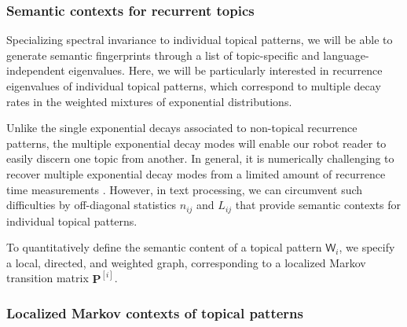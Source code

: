 \documentclass[10pt,journal,compsoc]{IEEEtran}
\begin{document}
\subsubsection{Semantic contexts for recurrent  topics}
Specializing  spectral invariance  to individual {topical patterns}, we will be able to generate  semantic fingerprints through a list of topic-specific and language-independent eigenvalues. Here, we will be particularly interested in recurrence eigenvalues of individual topical patterns, which correspond to multiple decay rates in the weighted mixtures of exponential distributions.


Unlike  the single exponential decays associated to non-topical recurrence patterns, the multiple exponential decay modes  will  enable our robot reader to easily discern one topic from another.
In general, it is  numerically challenging  to  recover multiple exponential decay modes from a limited amount of  recurrence time measurements \cite{BJ2006}. However, in text processing, we can circumvent such difficulties by  off-diagonal statistics $n_{ij}$ and $L_{ij}$ that provide  semantic contexts for individual topical patterns.


To quantitatively define the semantic content of a topical pattern  $ \mathsf W_i$, we   specify a local, directed, and weighted graph, corresponding to a localized Markov transition matrix $ \mathbf{ P}^{[i]}$.
\subsubsection{Localized Markov contexts of topical patterns}
\end{document}
